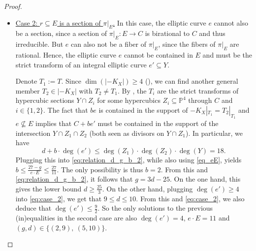 \documentclass[english,11pt,reqno]{amsart}
\newcommand{\sub}{\subseteq}
\newcommand{\Pfour}{\mathbb{P}^4}
\begin{document}
\begin{proof}
\begin{itemize}
Equation \eqref{eq:relation_d_g_b_2} together with the fact that $b\geq 2$ implies that $3d\leq 25+g$ and hence, $3d+3-2g\leq 28-g\leq 28.$ But then \eqref{eq:relation_d_g_b_1} and \eqref{eq:case_1} become
$$b\leq\frac{3d+3-2g}{e\cdot E} \overset{\eqref{eq_eE}}{\leq}\frac{28}{11 }, $$
which yields $b=2$. Plugging this into \eqref{eq:relation_d_g_b_2} gives $g=3d-25$. \par
On the one hand, this provides the lower bound $d\geq \frac{25}{3}$. On the other hand, plugging $-2g=50-6d$ into \eqref{eq:relation_d_g_b_1}, together with the inequalities \eqref{eq:case_1} and \eqref{eq_eE}, we obtain that $d\leq\frac{31}{3}$. This upper bound, together with the lower bound for $d$ and the fact that $g=3d-25$, shows that the only possible $(g,d)$-pairs are $(g,d)=(5,10)$ and $(g,d)=(2,9)$. \par 
Moreover, equation \eqref{eq:relation_d_g_b_1} and \eqref{eq:case_1} then imply that $e\cdot E \leq 13$. Since we also have that $e\cdot E\geq 11$ and $e\cdot E = 3\deg(e')-1$ by \eqref{eq_eE}, the only possibility is that $e\cdot E =11$ and $\deg(e')=4$. \par 
% 
\item \underline{Case 2: $r\sub E$ is a section of $\pi|_E$.} In this case, the elliptic curve $e$ cannot also be a section, since a section of $\pi|_E:E\rightarrow C$ is birational to $C$ and thus irreducible. But $e$ can also not be a fiber of $\pi|_E$, since the fibers of $\pi|_E$ are rational. Hence, the elliptic curve $e$ cannot be contained in $E$ and must be the strict transform of an integral elliptic curve $e'\sub Y$. \par 
Denote $T_1:=T$. Since $\dim(|-K_X|)\geq 4$ (), we can find another general member $T_2\in |-K_X|$ with $T_2\neq T_1$. By , the $T_i$ are the strict transforms of hypercubic sections $Y\cap Z_i$ for some hypercubics $Z_i\sub \Pfour$ through $C$ and $i\in\{1,2\}$. The fact that $be$ is contained in the support of $-K_X|_{T_1}=T_2|_{T_1}$ and $e\not \sub E$ implies that $C+be'$ must be contained in the support of the intersection $Y\cap Z_1\cap Z_2$ (both seen as divisors on $Y\cap Z_1$). In particular, we have
\begin{equation} \label{eq:case_2} \tag{$\bullet_2$}
	d+b \cdot \deg(e')\leq \deg(Z_1)\cdot \deg(Z_2)\cdot \deg(Y)=18.
\end{equation} 
%
Plugging this into \eqref{eq:relation_d_g_b_2}, while also using \eqref{eq_eE}, yields $b\leq \frac{27-g}{e\cdot E}\leq \frac{27}{11}$. The only possibility is thus $b=2$. From this and \eqref{eq:relation_d_g_b_2}, it follows that $g=3d-25$. On the one hand, this gives the lower bound $d\geq \frac{25}{3}$. On the other hand, plugging $\deg(e')\geq4$ into \eqref{eq:case_2}, we get that $9\leq d\leq10$. From this and \eqref{eq:case_2}, we also deduce that $\deg(e')\leq \frac{9}{2}$. So the only solutions to the previous (in)equalities in the second case are also $\deg(e')=4$, $e\cdot E=11$ and $(g,d)\in\{(2,9),\:(5,10)\}$.

\end{itemize}
\end{proof}
\end{document}
